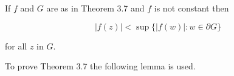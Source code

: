 If $f$ and $G$ are as in Theorem 3.7 and $f$ is not constant then

$$|f(z)| < \sup \{ |f(w)| : w \in \partial G \}$$

for all $z$ in $G$.

To prove Theorem 3.7 the following lemma is used.